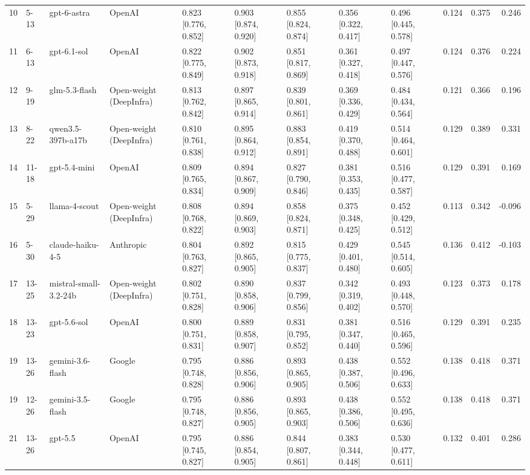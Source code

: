 \begin{table}
\begin{tabular}{rllllllllrrr}
10 & 5-13 & gpt-6-astra & OpenAI & 0.823 [0.776, 0.852] & 0.903 [0.874, 0.920] & 0.855 [0.824, 0.874] & 0.356 [0.322, 0.417] & 0.496 [0.445, 0.578] & 0.124 & 0.375 & 0.246 \\
11 & 6-13 & gpt-6.1-sol & OpenAI & 0.822 [0.775, 0.849] & 0.902 [0.873, 0.918] & 0.851 [0.817, 0.869] & 0.361 [0.327, 0.418] & 0.497 [0.447, 0.576] & 0.124 & 0.376 & 0.224 \\
12 & 9-19 & glm-5.3-flash & Open-weight (DeepInfra) & 0.813 [0.762, 0.842] & 0.897 [0.865, 0.914] & 0.839 [0.801, 0.861] & 0.369 [0.336, 0.429] & 0.484 [0.434, 0.564] & 0.121 & 0.366 & 0.196 \\
13 & 8-22 & qwen3.5-397b-a17b & Open-weight (DeepInfra) & 0.810 [0.761, 0.838] & 0.895 [0.864, 0.912] & 0.883 [0.854, 0.891] & 0.419 [0.370, 0.488] & 0.514 [0.464, 0.601] & 0.129 & 0.389 & 0.331 \\
14 & 11-18 & gpt-5.4-mini & OpenAI & 0.809 [0.765, 0.834] & 0.894 [0.867, 0.909] & 0.827 [0.790, 0.846] & 0.381 [0.353, 0.435] & 0.516 [0.477, 0.587] & 0.129 & 0.391 & 0.169 \\
15 & 5-29 & llama-4-scout & Open-weight (DeepInfra) & 0.808 [0.768, 0.822] & 0.894 [0.869, 0.903] & 0.858 [0.824, 0.871] & 0.375 [0.348, 0.425] & 0.452 [0.429, 0.512] & 0.113 & 0.342 & -0.096 \\
16 & 5-30 & claude-haiku-4-5 & Anthropic & 0.804 [0.763, 0.827] & 0.892 [0.865, 0.905] & 0.815 [0.775, 0.837] & 0.429 [0.401, 0.480] & 0.545 [0.514, 0.605] & 0.136 & 0.412 & -0.103 \\
17 & 13-25 & mistral-small-3.2-24b & Open-weight (DeepInfra) & 0.802 [0.751, 0.828] & 0.890 [0.858, 0.906] & 0.837 [0.799, 0.856] & 0.342 [0.319, 0.402] & 0.493 [0.448, 0.570] & 0.123 & 0.373 & 0.178 \\
18 & 13-23 & gpt-5.6-sol & OpenAI & 0.800 [0.751, 0.831] & 0.889 [0.858, 0.907] & 0.831 [0.795, 0.852] & 0.381 [0.347, 0.440] & 0.516 [0.465, 0.596] & 0.129 & 0.391 & 0.235 \\
19 & 13-26 & gemini-3.6-flash & Google & 0.795 [0.748, 0.828] & 0.886 [0.856, 0.906] & 0.893 [0.865, 0.905] & 0.438 [0.387, 0.506] & 0.552 [0.496, 0.633] & 0.138 & 0.418 & 0.371 \\
19 & 12-26 & gemini-3.5-flash & Google & 0.795 [0.748, 0.827] & 0.886 [0.856, 0.905] & 0.893 [0.865, 0.903] & 0.438 [0.386, 0.506] & 0.552 [0.495, 0.636] & 0.138 & 0.418 & 0.371 \\
21 & 13-26 & gpt-5.5 & OpenAI & 0.795 [0.745, 0.827] & 0.886 [0.854, 0.905] & 0.844 [0.807, 0.861] & 0.383 [0.344, 0.448] & 0.530 [0.477, 0.611] & 0.132 & 0.401 & 0.286 \\

\end{tabular}
\end{table}
